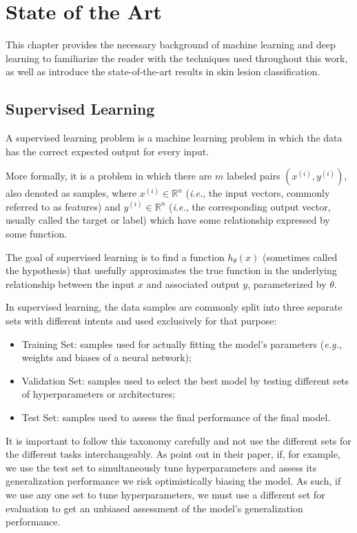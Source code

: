 \chapter{State of the Art}
\label{chapter:sota}

This chapter provides the necessary background of machine learning and deep learning to familiarize the reader with the techniques used throughout this work, as well as introduce the state-of-the-art results in skin lesion classification.

\section{Supervised Learning}

A supervised learning problem is a machine learning problem in which the data has the correct expected output for every input.

More formally, it is a problem in which there are $m$ labeled pairs $(x^{(i)}, y^{(i)})$, also denoted as samples, where $x^{(i)} \in \mathbb{R}^n$ (\textit{i.e.}, the input vectors, commonly referred to as features) and $y^{(i)} \in \mathbb{R}^n$ (\textit{i.e.}, the corresponding output vector, usually called the target or label) which have some relationship expressed by some function.

The goal of supervised learning is to find a function $h_{\theta}(x)$ (sometimes called the hypothesis) that usefully approximates the true function in the underlying relationship between the input $x$ and associated output $y$, parameterized by $\theta$.

In supervised learning, the data samples are commonly split into three separate sets with different intents and used exclusively for that purpose:

\begin{itemize}
    \item Training Set: samples used for actually fitting the model's parameters (\textit{e.g.}, weights and biases of a neural network);
    \item Validation Set: samples used to select the best model by testing different sets of hyperparameters or architectures;
    \item Test Set: samples used to assess the final performance of the final model.
\end{itemize}

It is important to follow this taxonomy carefully and not use the different sets for the different tasks interchangeably. As \citeauthor{crossvalidationbias} point out in their \citeyear{crossvalidationbias} paper, if, for example, we use the test set to simultaneously tune hyperparameters and assess its generalization performance we risk optimistically biasing the model. As such, if we use any one set to tune hyperparameters, we must use a different set for evaluation to get an unbiased assessment of the model's generalization performance.


